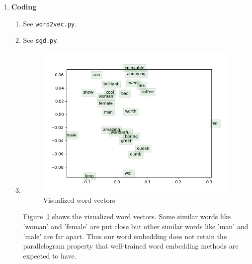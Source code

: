 \documentclass[12pt, dvipdfmx]{article}
\begin{document}
\begin{enumerate}[label=\textbf{\arabic*}]
\begin{enumerate}[label=(\alph*)]
\begin{enumerate}[label=(\roman*)]
\end{enumerate}
\end{enumerate}
\item \textbf{Coding}
\begin{enumerate}[label=(\alph*)]
\item See \texttt{word2vec.py}.
\item See \texttt{sgd.py}.
\item \begin{figure}
  \centering
  \includegraphics{../word_vectors.png}
  \caption{Visualized word vectors}
  \label{fig:word_vectors}
\end{figure}
Figure~\ref{fig:word_vectors} shows the visualized word vectors. Some similar words like 'woman' and 'female' are put close but other similar words like 'man' and 'male' are far apart. Thus our word embedding does not retain the parallelogram property that well-trained word embedding methods are expected to have.
\end{enumerate}
\end{enumerate}
\end{document}
